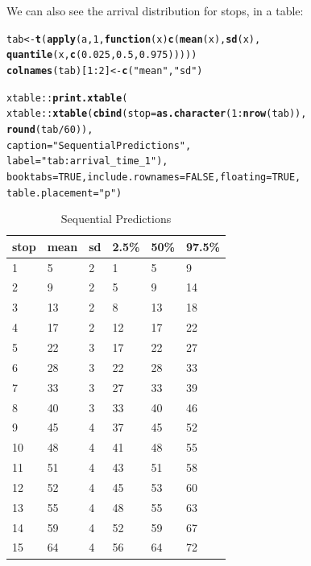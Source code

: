 \documentclass[11pt]{article}\usepackage[]{graphicx}\usepackage[]{color}
\makeatletter
\newcommand{\hlnum}[1]{\textcolor[rgb]{0.686,0.059,0.569}{#1}}%
\newcommand{\hlstr}[1]{\textcolor[rgb]{0.192,0.494,0.8}{#1}}%
\newcommand{\hlopt}[1]{\textcolor[rgb]{0,0,0}{#1}}%
\newcommand{\hlstd}[1]{\textcolor[rgb]{0.345,0.345,0.345}{#1}}%
\newcommand{\hlkwa}[1]{\textcolor[rgb]{0.161,0.373,0.58}{\textbf{#1}}}%
\newcommand{\hlkwb}[1]{\textcolor[rgb]{0.69,0.353,0.396}{#1}}%
\newcommand{\hlkwc}[1]{\textcolor[rgb]{0.333,0.667,0.333}{#1}}%
\newcommand{\hlkwd}[1]{\textcolor[rgb]{0.737,0.353,0.396}{\textbf{#1}}}%
\newenvironment{kframe}{%
 \def\at@end@of@kframe{}%
 \ifinner\ifhmode%
  \def\at@end@of@kframe{\end{minipage}}%
  \begin{minipage}{\columnwidth}%
 \fi\fi%
 \def\FrameCommand##1{\hskip\@totalleftmargin \hskip-\fboxsep
 \colorbox{shadecolor}{##1}\hskip-\fboxsep
     \hskip-\linewidth \hskip-\@totalleftmargin \hskip\columnwidth}%
 \MakeFramed {\advance\hsize-\width
   \@totalleftmargin\z@ \linewidth\hsize
   \@setminipage}}%
 {\par\unskip\endMakeFramed%
 \at@end@of@kframe}
\makeatother
\begin{document}
We can also see the arrival distribution for stops, in a table:
\begin{kframe}
\begin{alltt}
\hlstd{tab} \hlkwb{<-} \hlkwd{t}\hlstd{(}\hlkwd{apply}\hlstd{(a,} \hlnum{1}\hlstd{,} \hlkwa{function}\hlstd{(}\hlkwc{x}\hlstd{)} \hlkwd{c}\hlstd{(}\hlkwd{mean}\hlstd{(x),} \hlkwd{sd}\hlstd{(x),}
                                   \hlkwd{quantile}\hlstd{(x,} \hlkwd{c}\hlstd{(}\hlnum{0.025}\hlstd{,} \hlnum{0.5}\hlstd{,} \hlnum{0.975}\hlstd{)))))}
\hlkwd{colnames}\hlstd{(tab)[}\hlnum{1}\hlopt{:}\hlnum{2}\hlstd{]} \hlkwb{<-} \hlkwd{c}\hlstd{(}\hlstr{"mean"}\hlstd{,} \hlstr{"sd"}\hlstd{)}

\hlstd{xtable}\hlopt{::}\hlkwd{print.xtable}\hlstd{(}
    \hlstd{xtable}\hlopt{::}\hlkwd{xtable}\hlstd{(}\hlkwd{cbind}\hlstd{(}\hlkwc{stop} \hlstd{=} \hlkwd{as.character}\hlstd{(}\hlnum{1}\hlopt{:}\hlkwd{nrow}\hlstd{(tab)),}
                         \hlkwd{round}\hlstd{(tab} \hlopt{/} \hlnum{60}\hlstd{)),}
                   \hlkwc{caption} \hlstd{=} \hlstr{"Sequential Predictions"}\hlstd{,}
                   \hlkwc{label} \hlstd{=} \hlstr{"tab:arrival_time_1"}\hlstd{),}
    \hlkwc{booktabs} \hlstd{=} \hlnum{TRUE}\hlstd{,} \hlkwc{include.rownames} \hlstd{=} \hlnum{FALSE}\hlstd{,} \hlkwc{floating} \hlstd{=} \hlnum{TRUE}\hlstd{,}
    \hlkwc{table.placement} \hlstd{=} \hlstr{"p"}\hlstd{)}
\end{alltt}
\end{kframe}%
\begin{table}[p]
\centering
\begin{tabular}{llllll}
  \toprule
stop & mean & sd & 2.5\% & 50\% & 97.5\% \\ 
  \midrule
1 & 5 & 2 & 1 & 5 & 9 \\ 
  2 & 9 & 2 & 5 & 9 & 14 \\ 
  3 & 13 & 2 & 8 & 13 & 18 \\ 
  4 & 17 & 2 & 12 & 17 & 22 \\ 
  5 & 22 & 3 & 17 & 22 & 27 \\ 
  6 & 28 & 3 & 22 & 28 & 33 \\ 
  7 & 33 & 3 & 27 & 33 & 39 \\ 
  8 & 40 & 3 & 33 & 40 & 46 \\ 
  9 & 45 & 4 & 37 & 45 & 52 \\ 
  10 & 48 & 4 & 41 & 48 & 55 \\ 
  11 & 51 & 4 & 43 & 51 & 58 \\ 
  12 & 52 & 4 & 45 & 53 & 60 \\ 
  13 & 55 & 4 & 48 & 55 & 63 \\ 
  14 & 59 & 4 & 52 & 59 & 67 \\ 
  15 & 64 & 4 & 56 & 64 & 72 \\ 
   \bottomrule
\end{tabular}
\caption{Sequential Predictions} 
\label{tab:arrival_time_1}
\end{table}
\end{document}
